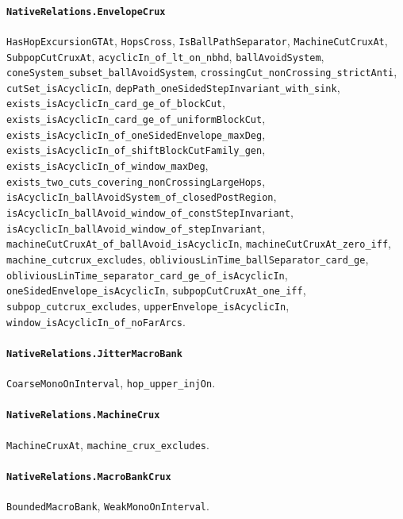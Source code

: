 \paragraph{\texttt{NativeRelations.EnvelopeCrux}}
{\small\raggedright \texttt{HasHopExcursionGTAt}, \texttt{HopsCross}, \texttt{IsBallPathSeparator}, \texttt{MachineCutCruxAt}, \texttt{SubpopCutCruxAt}, \texttt{acyclicIn\_of\_lt\_on\_nbhd}, \texttt{ballAvoidSystem}, \texttt{coneSystem\_subset\_ballAvoidSystem}, \texttt{crossingCut\_nonCrossing\_strictAnti}, \texttt{cutSet\_isAcyclicIn}, \texttt{depPath\_oneSidedStepInvariant\_with\_sink}, \texttt{exists\_isAcyclicIn\_card\_ge\_of\_blockCut}, \texttt{exists\_isAcyclicIn\_card\_ge\_of\_uniformBlockCut}, \texttt{exists\_isAcyclicIn\_of\_oneSidedEnvelope\_maxDeg}, \texttt{exists\_isAcyclicIn\_of\_shiftBlockCutFamily\_gen}, \texttt{exists\_isAcyclicIn\_of\_window\_maxDeg}, \texttt{exists\_two\_cuts\_covering\_nonCrossingLargeHops}, \texttt{isAcyclicIn\_ballAvoidSystem\_of\_closedPostRegion}, \texttt{isAcyclicIn\_ballAvoid\_window\_of\_constStepInvariant}, \texttt{isAcyclicIn\_ballAvoid\_window\_of\_stepInvariant}, \texttt{machineCutCruxAt\_of\_ballAvoid\_isAcyclicIn}, \texttt{machineCutCruxAt\_zero\_iff}, \texttt{machine\_cutcrux\_excludes}, \texttt{obliviousLinTime\_ballSeparator\_card\_ge}, \texttt{obliviousLinTime\_separator\_card\_ge\_of\_isAcyclicIn}, \texttt{oneSidedEnvelope\_isAcyclicIn}, \texttt{subpopCutCruxAt\_one\_iff}, \texttt{subpop\_cutcrux\_excludes}, \texttt{upperEnvelope\_isAcyclicIn}, \texttt{window\_isAcyclicIn\_of\_noFarArcs}.\par}

\paragraph{\texttt{NativeRelations.JitterMacroBank}}
{\small\raggedright \texttt{CoarseMonoOnInterval}, \texttt{hop\_upper\_injOn}.\par}

\paragraph{\texttt{NativeRelations.MachineCrux}}
{\small\raggedright \texttt{MachineCruxAt}, \texttt{machine\_crux\_excludes}.\par}

\paragraph{\texttt{NativeRelations.MacroBankCrux}}
{\small\raggedright \texttt{BoundedMacroBank}, \texttt{WeakMonoOnInterval}.\par}

